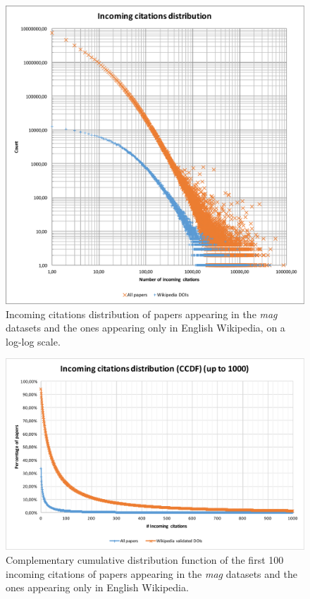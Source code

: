 \begin{figure}[h]
\centering
\includegraphics[keepaspectratio=true, width=\textwidth]{assets/incoming_cits_loglog}
\caption{Incoming citations distribution of papers appearing in the \emph{mag} datasets and the ones appearing only in English Wikipedia, on a log-log scale.}
\label{fig:incoming_citations_loglog}
\end{figure}

\begin{figure}[h]
\centering
\includegraphics[keepaspectratio=true, width=\textwidth]{assets/incoming_cits_ccdf_1000}
\caption{Complementary cumulative distribution function of the first 100 incoming citations of papers appearing in the \emph{mag} datasets and the ones appearing only in English Wikipedia.}
\label{fig:incoming_citations_ccdf_1000}
\end{figure}

